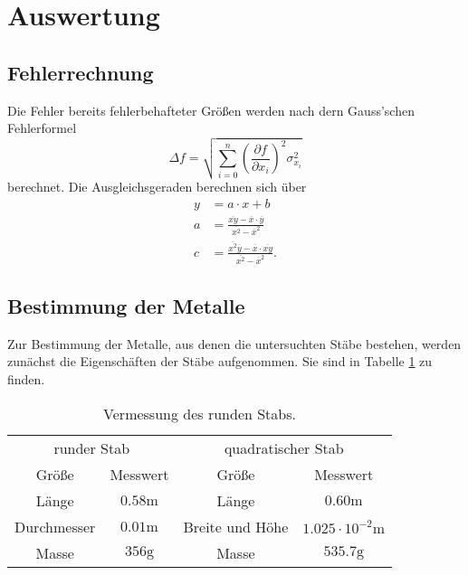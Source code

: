 \section{Auswertung}
\label{sec:Auswertung}
\subsection{Fehlerrechnung}
  Die Fehler bereits fehlerbehafteter Größen werden nach dern Gauss'schen Fehlerformel
  \begin{equation*}
    \Delta f = \sqrt{ \sum_{i = 0}^n \left(\frac{\partial f}{\partial x_i}\right)^2 \sigma_{x_i}^2 }
  \end{equation*}
  berechnet. Die Ausgleichsgeraden berechnen sich über 
  \begin{align*}
    y &= a \cdot x + b\\
    a &= \frac{\overline{xy} - \overline{x} \cdot \overline{y}}{\overline{x^2} - \overline{x}^2}\\
    c &= \frac{ \overline{x^2} \overline{y} - \overline{x} \cdot \overline{xy}}{\overline{x^2} - \overline{x}^2}.
  \end{align*}

\subsection{Bestimmung der Metalle}
  Zur Bestimmung der Metalle, aus denen die untersuchten Stäbe bestehen, werden
  zunächst die Eigenschäften der Stäbe aufgenommen. Sie sind in Tabelle \ref{tab:mass}
  zu finden.

  \begin{table}
    \centering
    \caption{Vermessung des runden Stabs.}
    \label{tab:mass}
    \begin{tabular}{c c c c}
      \toprule
      \multicolumn{2}{c}{runder Stab} & \multicolumn{2}{c}{quadratischer Stab}\\
      \cmidrule(lr){1-2}\cmidrule(lr){3-4}{Größe} & {Messwert } & {Größe} & {Messwert}\\
      \midrule
      Länge & $0.58 \si{\m}$& Länge & $0.60 \si{\m}$\\
      Durchmesser & $0.01 \si{\m}$& Breite und Höhe & $1.025 \cdot 10^{-2} \si{\m}$\\
      Masse & $356 \si{\g}$ & Masse & $535.7 \si{\g}$\\
      \bottomrule
    \end{tabular}
  \end{table}

